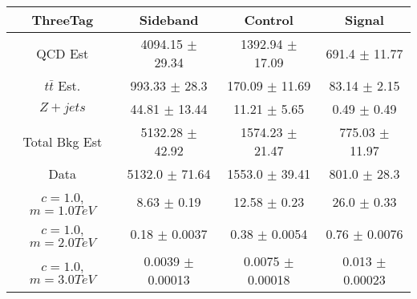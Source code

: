 \begin{footnotesize} 
\begin{tabular}{c|c|c|c} 
ThreeTag & Sideband & Control & Signal \\ 
\hline\hline 
QCD Est & 4094.15 $\pm$ 29.34 & 1392.94 $\pm$ 17.09 & 691.4 $\pm$ 11.77\\ 
$t\bar{t}$ Est.  & 993.33 $\pm$ 28.3 & 170.09 $\pm$ 11.69 & 83.14 $\pm$ 2.15\\ 
$Z+jets$ & 44.81 $\pm$ 13.44 & 11.21 $\pm$ 5.65 & 0.49 $\pm$ 0.49\\ 
Total Bkg Est & 5132.28 $\pm$ 42.92 & 1574.23 $\pm$ 21.47 & 775.03 $\pm$ 11.97\\ 
Data & 5132.0 $\pm$ 71.64 & 1553.0 $\pm$ 39.41 & 801.0 $\pm$ 28.3\\ 
$c=1.0$,$m=1.0TeV$ & 8.63 $\pm$ 0.19 & 12.58 $\pm$ 0.23 & 26.0 $\pm$ 0.33\\ 
$c=1.0$,$m=2.0TeV$ & 0.18 $\pm$ 0.0037 & 0.38 $\pm$ 0.0054 & 0.76 $\pm$ 0.0076\\ 
$c=1.0$,$m=3.0TeV$ & 0.0039 $\pm$ 0.00013 & 0.0075 $\pm$ 0.00018 & 0.013 $\pm$ 0.00023\\ 
\hline\hline 
\end{tabular} 
\end{footnotesize} 
\newline 
